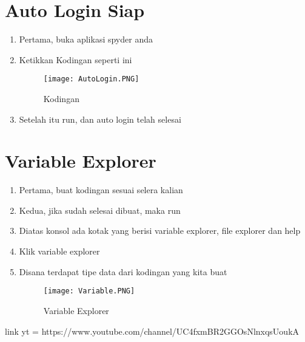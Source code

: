 \documentclass{article}
\begin{document}
\newpage
\section{Auto Login Siap}
\begin{enumerate}
    \item Pertama, buka aplikasi spyder anda
    \item Ketikkan Kodingan seperti ini
\begin{figure}
    \centering
    \texttt{[image: AutoLogin.PNG]}
    \caption{Kodingan}
\end{figure}
    \item Setelah itu run, dan auto login telah selesai
\end{enumerate}

\newpage
\section{Variable Explorer}
\begin{enumerate}
    \item Pertama, buat kodingan sesuai selera kalian
    \item Kedua, jika sudah selesai dibuat, maka run
    \item Diatas konsol ada kotak yang berisi variable explorer, file explorer dan help
    \item Klik variable explorer
    \item Disana terdapat tipe data dari kodingan yang kita buat
\begin{figure}
    \centering
    \texttt{[image: Variable.PNG]}
    \caption{Variable Explorer}
\end{figure}
\end{enumerate}
link yt = https://www.youtube.com/channel/UC4fxmBR2GGOsNlnxqsUoukA
\end{document}
